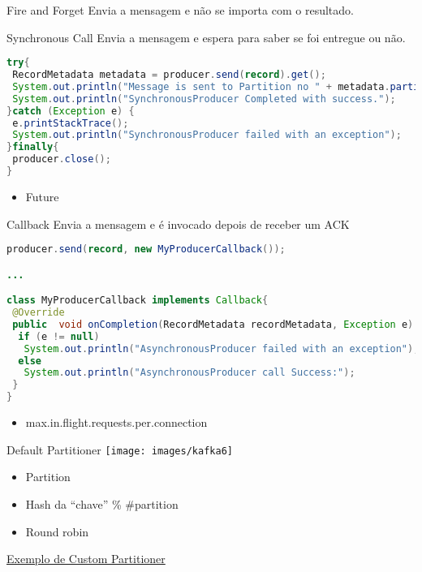 \begin{frame}{Fire and Forget}
Envia a mensagem e não se importa com o resultado.
\end{frame}

\begin{frame}[fragile]{Synchronous Call}
Envia a mensagem e espera para saber se foi entregue ou não.

\begin{lstlisting}[language=Java]
try{
 RecordMetadata metadata = producer.send(record).get();
 System.out.println("Message is sent to Partition no " + metadata.partition() + " and offset " + metadata.offset());
 System.out.println("SynchronousProducer Completed with success.");
}catch (Exception e) {
 e.printStackTrace();
 System.out.println("SynchronousProducer failed with an exception");
}finally{
 producer.close();
}
\end{lstlisting}
\begin{itemize}
	\item Future
\end{itemize}
\end{frame}

\begin{frame}[fragile]{Callback}
Envia a mensagem e é invocado depois de receber um ACK

\begin{lstlisting}[language=Java]
producer.send(record, new MyProducerCallback());

...

class MyProducerCallback implements Callback{
 @Override
 public  void onCompletion(RecordMetadata recordMetadata, Exception e) {
  if (e != null)
   System.out.println("AsynchronousProducer failed with an exception");
  else
   System.out.println("AsynchronousProducer call Success:");
 }
}
\end{lstlisting}
\begin{itemize}
	\item max.in.flight.requests.per.connection
\end{itemize}
\end{frame}


\begin{frame}{Default Partitioner}
\texttt{[image: images/kafka6]}

\begin{itemize}
	\item Partition
	\item Hash da ``chave'' \% \#partition
	\item Round robin
\end{itemize}

\href{https://github.com/LearningJournal/ApacheKafkaTutorials/blob/master/ProducerExamples/SensorPartitioner.java}{Exemplo de Custom Partitioner}
\end{frame}

